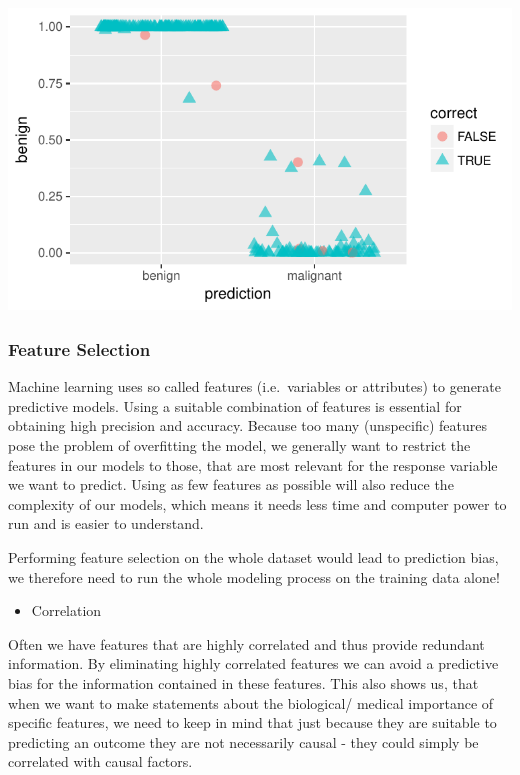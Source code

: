 \documentclass[]{article}
\providecommand{\tightlist}{%
  \setlength{\itemsep}{0pt}\setlength{\parskip}{0pt}}
\begin{document}
\includegraphics{webinar_code_files/figure-latex/results_jitter_xgb-1.pdf}

\subsubsection{Feature Selection}\label{feature-selection}

Machine learning uses so called features (i.e.~variables or attributes)
to generate predictive models. Using a suitable combination of features
is essential for obtaining high precision and accuracy. Because too many
(unspecific) features pose the problem of overfitting the model, we
generally want to restrict the features in our models to those, that are
most relevant for the response variable we want to predict. Using as few
features as possible will also reduce the complexity of our models,
which means it needs less time and computer power to run and is easier
to understand.

Performing feature selection on the whole dataset would lead to
prediction bias, we therefore need to run the whole modeling process on
the training data alone!

\begin{itemize}
\tightlist
\item
  Correlation
\end{itemize}

Often we have features that are highly correlated and thus provide
redundant information. By eliminating highly correlated features we can
avoid a predictive bias for the information contained in these features.
This also shows us, that when we want to make statements about the
biological/ medical importance of specific features, we need to keep in
mind that just because they are suitable to predicting an outcome they
are not necessarily causal - they could simply be correlated with causal
factors.
\end{document}
